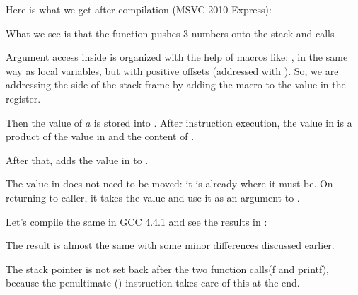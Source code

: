 

Here is what we get after compilation (MSVC 2010 Express):




What we see is that the \main function pushes 3 numbers onto the stack and calls  

Argument access inside \ttf is organized with the help of macros like: , 
in the same way as local variables, but with positive offsets (addressed with ).
So, we are addressing the  side of the \gls{stack frame} by adding the  macro to the value in the \EBP register.


Then the value of $a$ is stored into \EAX. After \IMUL instruction execution, the value in \EAX is 
a \gls{product} of the value in \EAX and the content of .

After that, \ADD adds the value in  to \EAX.

The value in \EAX does not need to be moved: it is already where it must be.
On returning to \gls{caller}, it takes the \EAX value and use it as an argument to \printf.




Let's compile the same in GCC 4.4.1 and see the results in \IDA:



The result is almost the same with some minor differences discussed earlier.

The \gls{stack pointer} is not set back after the two function calls(f and printf), 
because the penultimate  () 
instruction takes care of this at the end.
